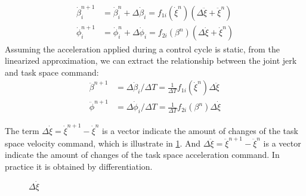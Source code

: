 \begin{equation}\label{eq:firstOrderApp}
\begin{split}
\dot{\beta}_i^{n+1}&=\dot{\beta}_i^n + \Delta\dot{\beta}_i=f_{1i}(\dot{\xi}^n)(\Delta\ddot{\xi}+\ddot{\xi}^n)\\
\dot{\phi}_i^{n+1}&=\dot{\phi}_i^n + \Delta\dot{\phi}_i=f_{2i}(\beta^n)(\Delta\dot{\xi}+\dot{\xi}^n)
\end{split}
\end{equation}
Assuming the acceleration applied during a control cycle is static, from the linearized approximation, we can extract the relationship between the joint jerk and task space command:
\begin{equation}\label{eq:deltaRelation}
    \begin{split}
        \ddot{\beta}^{n+1}&=\Delta\dot{\beta}_i/\Delta T=\frac{1}{\Delta T}f_{1i}(\dot{\xi}^n)\Delta\ddot{\xi}\\
        \ddot{\phi}^{n+1}&=\Delta\dot{\phi}_i/\Delta T=\frac{1}{\Delta T}f_{2i}(\beta^n)\Delta\dot{\xi}
    \end{split}
\end{equation}

The term $\Delta\dot{\xi}=\dot{\xi}^{n+1}-\dot{\xi}^n$ is a vector indicate the amount of changes of the task space velocity command, which is illustrate in \cref{fig:deltaXi}. And $\Delta\ddot{\xi}=\ddot{\xi}^{n+1}-\ddot{\xi}^n$ is a vector indicate the amount of changes of the task space acceleration command. In practice it is obtained by differentiation.
\begin{figure}\label{fig:deltaXi}
    \centering
    \caption{$\Delta\dot{\xi}$}
    \label{fig:deltaXi}
\end{figure}  



